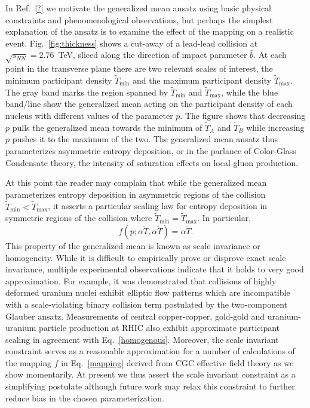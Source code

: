 \documentclass[aps,prc,reprint,amsmath,nofootinbib]{revtex4-1}
\newcommand{\sqrts}{\sqrt{s_{NN}}}
\newcommand{\T}{\tilde{T}}
\begin{document}
In Ref.~\ref{?} we motivate the generalized mean ansatz using basic physical constraints and phenomenological observations, but perhaps the simplest explanation of the ansatz is to examine the effect of the mapping on a realistic event. Fig.~\ref{fig:thickness} shows a cut-away of a lead-lead collision at $\sqrts=2.76$~TeV, sliced along the direction of impact parameter $\hat{b}$. At each point in the transverse plane there are two relevant scales of interest, the minimum participant density $\T_\text{min}$ and the maximum participant density $\T_\text{max}$. The gray band marks the region spanned by $\T_\text{min}$ and $\T_\text{max}$, while the blue band/line show the generalized mean acting on the participant density of each nucleus with different values of the parameter $p$. The figure shows that decreasing $p$ pulls the generalized mean towards the minimum of $\T_A$ and $\T_B$ while increasing $p$ pushes it to the maximum of the two. The generalized mean ansatz thus parameterizes asymmetric entropy deposition, or in the parlance of Color-Glass Condensate theory, the intensity of saturation effects on local gluon production.

At this point the reader may complain that while the generalized mean parameterizes entropy deposition in asymmetric regions of the collision $\T_\text{min} < \T_\text{max}$, it asserts a particular scaling law for entropy deposition in symmetric regions of the collision where $\T_\text{min} = \T_\text{max}$. In particular, 
\begin{equation}
    \label{homogenous}
    f(p; \alpha \T, \alpha \T) = \alpha \T. 
\end{equation}
This property of the generalized mean is known as scale invariance or homogeneity. While it is difficult to empirically prove or disprove exact scale invariance, multiple experimental observations indicate that it holds to very good approximation. For example, it was demonstrated that collisions of highly deformed uranium nuclei exhibit elliptic flow patterns which are incompatible with a scale-violating binary collision term postulated by the two-component Glauber ansatz. Measurements of central copper-copper, gold-gold and uranium-uranium particle production at RHIC also exhibit approximate participant scaling in agreement with Eq.~\eqref{homogenous}. Moreover, the scale invariant constraint serves as a reasonable approximation for a number of calculations of the mapping $f$ in Eq.~\eqref{mapping} derived from CGC effective field theory as we show momentarily. At present we thus assert the scale invariant constraint as a simplifying postulate although future work may relax this constraint to further reduce bias in the chosen parameterization.  
\end{document}
